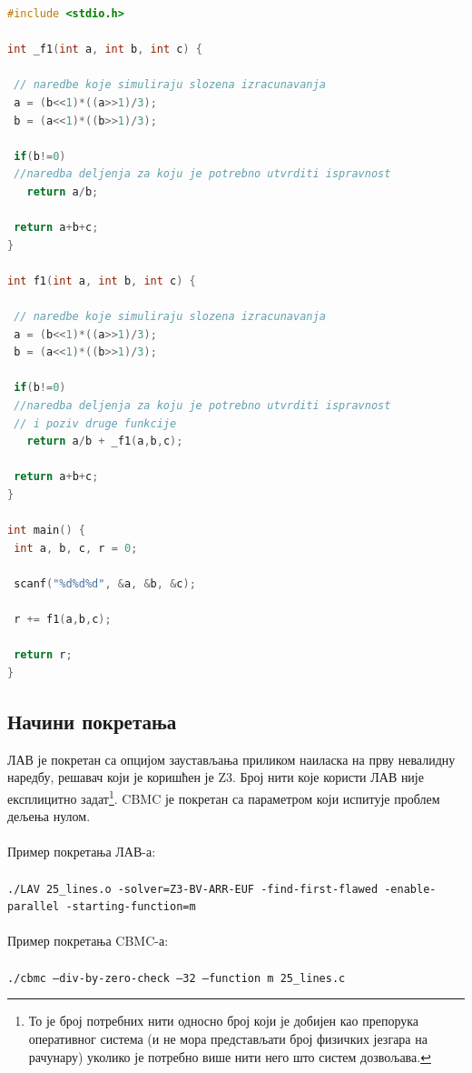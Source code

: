 \documentclass[12pt,oneside]{memoir}
\begin{document}
\begin{lstlisting}[basicstyle=\fontsize{4}{4}\selectfont,language=C,frame=single,caption=Пример програма друге категорије (друга верзија),label=primer_nivo_2t]
#include <stdio.h>

int _f1(int a, int b, int c) {

 // naredbe koje simuliraju slozena izracunavanja 
 a = (b<<1)*((a>>1)/3);
 b = (a<<1)*((b>>1)/3);
 
 if(b!=0)
 //naredba deljenja za koju je potrebno utvrditi ispravnost
   return a/b;
   
 return a+b+c;
}

int f1(int a, int b, int c) {

 // naredbe koje simuliraju slozena izracunavanja 
 a = (b<<1)*((a>>1)/3);
 b = (a<<1)*((b>>1)/3);
 
 if(b!=0)
 //naredba deljenja za koju je potrebno utvrditi ispravnost
 // i poziv druge funkcije 
   return a/b + _f1(a,b,c);
   
 return a+b+c;
}

int main() {
 int a, b, c, r = 0;
 
 scanf("%d%d%d", &a, &b, &c);
 
 r += f1(a,b,c);
 
 return r;
}


\end{lstlisting}



\subsection{Начини покретања}

ЛАВ је покретан са опцијом заустављања приликом наиласка на прву невалидну наредбу, решавач који је коришћен је Z3. Број нити које користи ЛАВ није експлицитно задат\footnote{То је број потребних нити односно број који је добијен као препорука оперативног система (и не мора представљати број физичких језгара на рачунару) уколико је потребно више нити него што систем дозвољава.}. CBMC је покретан са параметром који испитује проблем дељења нулом.
\\
\\
Пример покретања ЛАВ-а:
\\ \\
\texttt{./LAV 25\_lines.o -solver=Z3-BV-ARR-EUF -find-first-flawed -enable-parallel -starting-function=m}
\\ \\
Пример покретања CBMC-а:
\\ \\
\texttt{./cbmc --div-by-zero-check --32 --function m 25\_lines.c}
\end{document}
